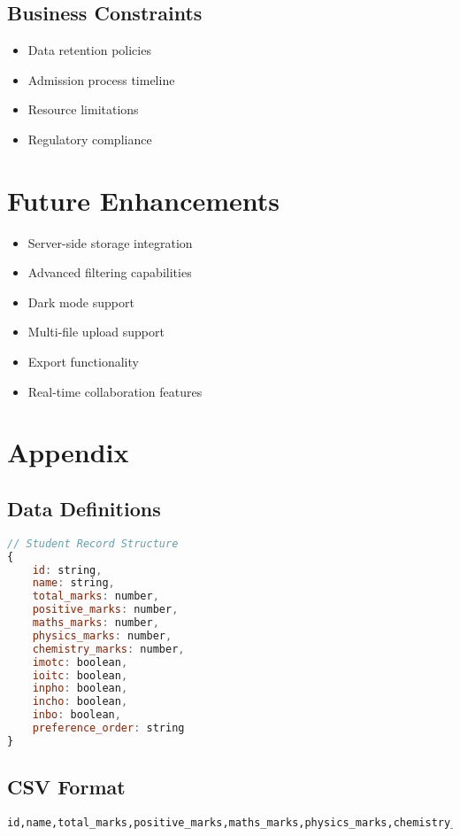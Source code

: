 \documentclass[12pt]{article}
\begin{document}
\subsection{Business Constraints}
\begin{itemize}
    \item Data retention policies
    \item Admission process timeline
    \item Resource limitations
    \item Regulatory compliance
\end{itemize}

\section{Future Enhancements}
\begin{itemize}
    \item Server-side storage integration
    \item Advanced filtering capabilities
    \item Dark mode support
    \item Multi-file upload support
    \item Export functionality
    \item Real-time collaboration features
\end{itemize}

\section{Appendix}

\subsection{Data Definitions}
\begin{lstlisting}[language=JavaScript]
// Student Record Structure
{
    id: string,
    name: string,
    total_marks: number,
    positive_marks: number,
    maths_marks: number,
    physics_marks: number,
    chemistry_marks: number,
    imotc: boolean,
    ioitc: boolean,
    inpho: boolean,
    incho: boolean,
    inbo: boolean,
    preference_order: string
}
\end{lstlisting}

\subsection{CSV Format}
\begin{lstlisting}
id,name,total_marks,positive_marks,maths_marks,physics_marks,chemistry_marks,imotc,ioitc,inpho,incho,inbo,preference_order
\end{lstlisting}
\end{document}

